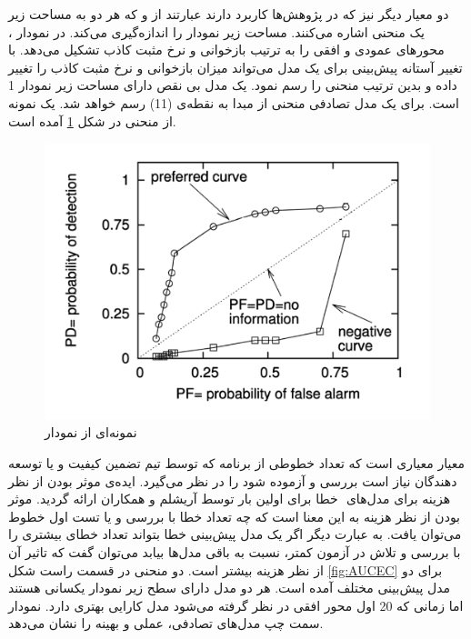 دو معیار دیگر نیز که در پژوهش‌ها کاربرد دارند عبارتند از 
  و 
که هر دو به مساحت زیر یک منحنی اشاره می‌کنند.   مساحت زیر نمودار
را اندازه‌گیری می‌کند. در نمودار ،  محورهای عمودی و افقی را به ترتیب بازخوانی و  نرخ مثبت کاذب تشکیل می‌دهد.  با تغییر آستانه پیش‌بینی برای یک مدل می‌تواند میزان بازخوانی و  نرخ مثبت کاذب را تغییر داده و بدین ترتیب منحنی  را رسم نمود. یک مدل بی نقص دارای مساحت زیر نمودار 1 است. برای یک مدل تصادفی  منحنی از مبدا به نقطه‌ی (1\lr{,}1) رسم خواهد شد. یک نمونه از منحنی  در شکل \ref{fig:ROC} آمده است. \\

\begin{figure}
	\centering
	\includegraphics[width=.60\textwidth]{images/ROC.PNG}
	\caption{ نمونه‌ای از نمودار  \cite{menzies2007data}}
	\label{fig:ROC}
\end{figure}

معیار  معیاری است که تعداد خطوطی از برنامه که  توسط تیم تضمین کیفیت و یا توسعه دهندگان نیاز است بررسی و آزموده شود را در نظر می‌گیرد. ایده‌ی  موثر بودن از نظر هزینه
برای مدل‌های ‌‌ خطا برای اولین بار توسط آریشلم و همکاران \cite{arisholm2007data} ارائه گردید. موثر بودن از نظر هزینه به این معنا است که چه تعداد خطا با بررسی و یا تست   اول خطوط می‌توان یافت. به عبارت دیگر اگر یک مدل پیش‌بینی خطا بتواند تعداد خطای بیشتری را با بررسی و تلاش در آزمون کمتر، نسبت به باقی مدل‌ها بیابد می‌توان گفت که تاثیر آن از نظر هزینه بیشتر است. دو منحنی در  قسمت راست شکل \ref{fig:AUCEC} برای دو مدل پیش‌بینی مختلف آمده است. هر دو مدل دارای سطح زیر نمودار یکسانی هستند اما زمانی که 20\lr{\%}  اول محور افقی در نظر گرفته می‌شود مدل 
  کارایی بهتری دارد. نمودار سمت چپ مدل‌های تصادفی، عملی و بهینه را نشان می‌دهد.

